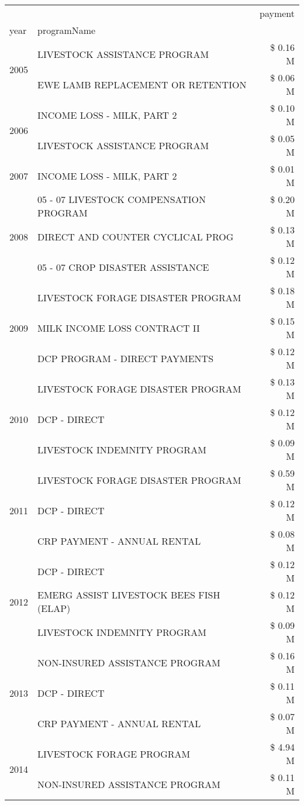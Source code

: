 \begin{tabular}{llr}
\toprule
 &  & payment \\
year & programName &  \\
\midrule
\multirow[t]{2}{*}{2005} & LIVESTOCK ASSISTANCE PROGRAM & \$ 0.16 M \\
 & EWE LAMB REPLACEMENT OR RETENTION & \$ 0.06 M \\
\cline{1-3}
\multirow[t]{2}{*}{2006} & INCOME LOSS - MILK, PART 2 & \$ 0.10 M \\
 & LIVESTOCK ASSISTANCE PROGRAM & \$ 0.05 M \\
\cline{1-3}
2007 & INCOME LOSS - MILK, PART 2 & \$ 0.01 M \\
\cline{1-3}
\multirow[t]{3}{*}{2008} & 05 - 07 LIVESTOCK COMPENSATION PROGRAM & \$ 0.20 M \\
 & DIRECT AND COUNTER CYCLICAL PROG & \$ 0.13 M \\
 & 05 - 07 CROP DISASTER ASSISTANCE & \$ 0.12 M \\
\cline{1-3}
\multirow[t]{3}{*}{2009} & LIVESTOCK FORAGE DISASTER  PROGRAM & \$ 0.18 M \\
 & MILK INCOME LOSS CONTRACT II & \$ 0.15 M \\
 & DCP PROGRAM - DIRECT PAYMENTS & \$ 0.12 M \\
\cline{1-3}
\multirow[t]{3}{*}{2010} & LIVESTOCK FORAGE DISASTER PROGRAM & \$ 0.13 M \\
 & DCP - DIRECT & \$ 0.12 M \\
 & LIVESTOCK INDEMNITY PROGRAM & \$ 0.09 M \\
\cline{1-3}
\multirow[t]{3}{*}{2011} & LIVESTOCK FORAGE DISASTER PROGRAM & \$ 0.59 M \\
 & DCP - DIRECT & \$ 0.12 M \\
 & CRP PAYMENT - ANNUAL RENTAL & \$ 0.08 M \\
\cline{1-3}
\multirow[t]{3}{*}{2012} & DCP - DIRECT & \$ 0.12 M \\
 & EMERG ASSIST LIVESTOCK BEES FISH (ELAP) & \$ 0.12 M \\
 & LIVESTOCK INDEMNITY PROGRAM & \$ 0.09 M \\
\cline{1-3}
\multirow[t]{3}{*}{2013} & NON-INSURED ASSISTANCE PROGRAM & \$ 0.16 M \\
 & DCP - DIRECT & \$ 0.11 M \\
 & CRP PAYMENT - ANNUAL RENTAL & \$ 0.07 M \\
\cline{1-3}
\multirow[t]{3}{*}{2014} & LIVESTOCK FORAGE PROGRAM & \$ 4.94 M \\
 & NON-INSURED ASSISTANCE PROGRAM & \$ 0.11 M \\

\end{tabular}
